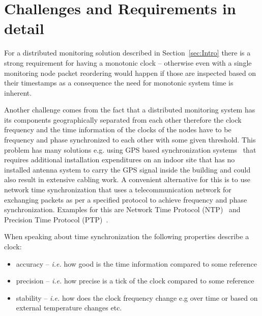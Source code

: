 \documentclass[journal]{IEEEtran}
\begin{document}
\section{Challenges and Requirements in detail}\label{sec:Challanges}


For a distributed monitoring solution described in Section~\ref{sec:Intro} there is a strong requirement for having
a monotonic clock -- otherwise even with a single monitoring node packet reordering would happen if those are inspected
based on their timestamps as a consequence the need for monotonic system time is inherent.

Another challenge comes from the fact that a distributed monitoring system has its components geographically
separated from each other therefore the clock frequency and the time information of the clocks of the nodes have to be
frequency and phase synchronized to each other with some given threshold. This problem has many solutions e.g. using
GPS based synchronization
systems~\cite{GPS-CLOCK} that requires additional installation expenditures on an indoor site that has no installed
antenna system to carry the GPS signal inside the building and could also result in extensive cabling work.
A convenient alternative for this is to use network time synchronization that uses a telecommunication network for
exchanging packets as per a specified protocol to achieve frequency and phase synchronization. Examples for this
are Network Time Protocol (NTP)~\cite{NTP_standard} and Precision Time Protocol (PTP)~\cite{PTP_standard}.

When speaking about time synchronization the following properties describe a clock:
\begin{itemize}
    \item accuracy -- \emph{i.e.} how good is the time information compared to some reference
    \item precision -- \emph{i.e.} how precise is a tick of the clock compared to some reference
    \item stability -- \emph{i.e.} how does the clock frequency change	e.g over time or based on external
          temperature changes etc.
\end{itemize}
\end{document}
